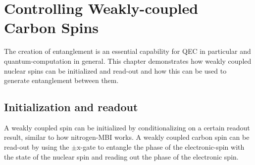 \chapter{Controlling Weakly-coupled Carbon Spins}
The creation of entanglement is an essential capability for QEC in particular and quantum-computation in general.
This chapter demonstrates how weakly coupled nuclear spins can be initialized and read-out and how this can be used to generate entanglement between them.








\section{Initialization and readout}
A weakly coupled spin can be initialized by conditionalizing on a certain readout result, similar to how nitrogen-MBI works.
A weakly coupled carbon spin can be read-out by using the $\pm \mathrm{x}$-gate to entangle the phase of the electronic-spin with the state of the nuclear spin and reading out the phase of the electronic spin.


